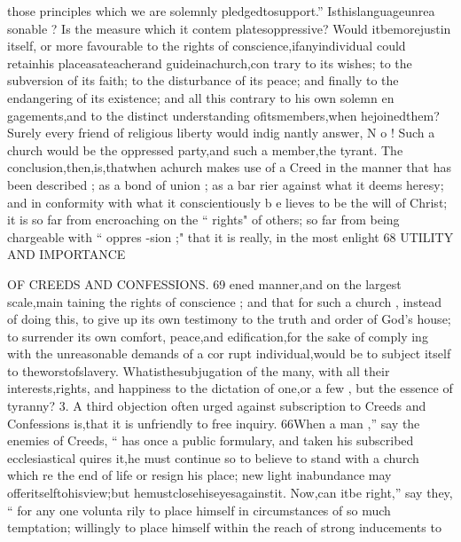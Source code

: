 \documentclass[
]{book}
\begin{document}
those principles which we are solemnly pledgedtosupport.'' Isthislanguageunrea sonable ? Is the measure which it contem
platesoppressive? Would itbemorejustin itself, or more favourable to the rights of conscience,ifanyindividual could retainhis
placeasateacherand guideinachurch,con trary to its wishes; to the subversion of its
faith; to the disturbance of its peace; and finally to the endangering of its existence; and all this contrary to his own solemn en gagements,and to the distinct understanding
ofitsmembers,when hejoinedthem?Surely every friend of religious liberty would indig nantly answer, N o ! Such a church would be
the oppressed party,and such a member,the tyrant.
The conclusion,then,is,thatwhen achurch makes use of a Creed in the manner that has
been described ; as a bond of union ; as a bar rier against what it deems heresy; and in conformity with what it conscientiously b e lieves to be the will of Christ; it is so far from encroaching on the `` rights" of others; so far from being chargeable with `` oppres
-sion ;" that it is really, in the most enlight
68 UTILITY AND IMPORTANCE

OF CREEDS AND CONFESSIONS. 69
ened manner,and on the largest scale,main taining the rights of conscience ; and that for
such a church , instead of doing this, to give up its own testimony to the truth and order of
God's house; to surrender its own comfort, peace,and edification,for the sake of comply
ing with the unreasonable demands of a cor rupt individual,would be to subject itself to
theworstofslavery. Whatisthesubjugation
of the many, with all their interests,rights,
and happiness to the dictation of one,or a few , but the essence of tyranny?
3. A third objection often urged against subscription to Creeds and Confessions is,that it is unfriendly to free inquiry.
66When a man ,'' say the enemies of Creeds, `` has once
a public formulary, and taken his
subscribed
ecclesiastical
quires it,he must continue so to believe to
stand with a church which re
the end of life or resign his place; new light inabundance may offeritselftohisview;but hemustclosehiseyesagainstit. Now,can
itbe right,'' say they, `` for any one volunta
rily to place himself in circumstances
of so
much temptation; willingly to place himself within the reach of strong inducements to
\end{document}
